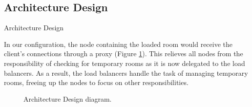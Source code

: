 \newpage

\subsection{Architecture Design}
Architecture Design

In our configuration, the node containing the loaded room would receive the client's connections through a proxy (Figure \ref{Figure::architecture}). This relieves all nodes from the responsibility of checking for temporary rooms as it is now delegated to the load balancers. As a result, the load balancers handle the task of managing temporary rooms, freeing up the nodes to focus on other responsibilities.

\begin{figure}
  \centering
  \caption{\label{Figure::architecture} Architecture Design diagram.}
\end{figure}

